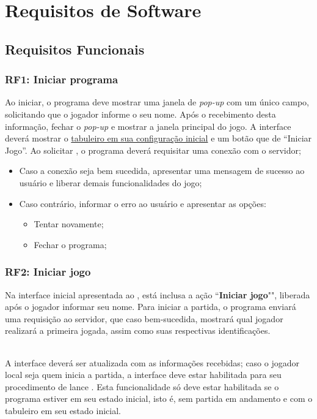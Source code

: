 \chapter{Requisitos de Software}

\section{Requisitos Funcionais}

\subsection{RF1: Iniciar programa}\label{subsection:RF1}
Ao iniciar, o programa deve mostrar uma janela de \textit{pop-up} com um único campo, solicitando que o jogador informe
o seu nome. Após o recebimento desta informação, fechar o \textit{pop-up} e mostrar a janela principal do jogo.
A interface deverá mostrar o \hyperref[fig:configuracao tabuleiro]{tabuleiro em sua configuração inicial} e um botão que
de ``Iniciar Jogo''. Ao solicitar , o programa deverá requisitar uma conexão com o servidor;
\begin{itemize}
  \item Caso a conexão seja bem sucedida, apresentar uma mensagem de sucesso ao usuário e liberar demais funcionalidades do jogo;
  \item Caso contrário, informar o erro ao usuário e apresentar as opções:
    \begin{itemize}
        \item Tentar novamente;
        \item Fechar o programa;
    \end{itemize}
\end{itemize}

\subsection{RF2: Iniciar jogo}\label{subsection:RF2}
Na interface inicial apresentada ao , está inclusa a ação ``\textbf{Iniciar jogo}"",
liberada após o jogador informar seu nome. Para iniciar a partida, o programa enviará uma requisição ao servidor, que
caso bem-sucedida, mostrará qual jogador realizará a primeira jogada, assim como suas respectivas identificações.
\subparagraph{} A interface deverá ser atualizada com as informações recebidas; caso o jogador local seja quem inicia a
partida, a interface deve estar habilitada para seu procedimento de lance . Esta
funcionalidade só deve estar habilitada se o programa estiver em seu estado inicial, isto é, sem partida em andamento e
com o tabuleiro em seu estado inicial. 

